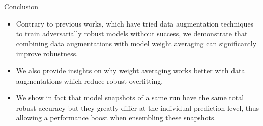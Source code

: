 \begin{frame}{Conclusion}
    \begin{itemize}[<+-| alert@+>] %
        \item Contrary to previous works, which have tried data augmentation techniques to train adversarially robust models without success, we demonstrate that combining data augmentations with model weight averaging can significantly improve robustness.
        \item We also provide insights on why weight averaging works better with data augmentations which reduce robust overfitting.
        \item We show in fact that model snapshots of a same run have the same total robust accuracy but they greatly differ at the individual prediction level, thus allowing a performance boost when ensembling these snapshots.
    \end{itemize}
\end{frame}

